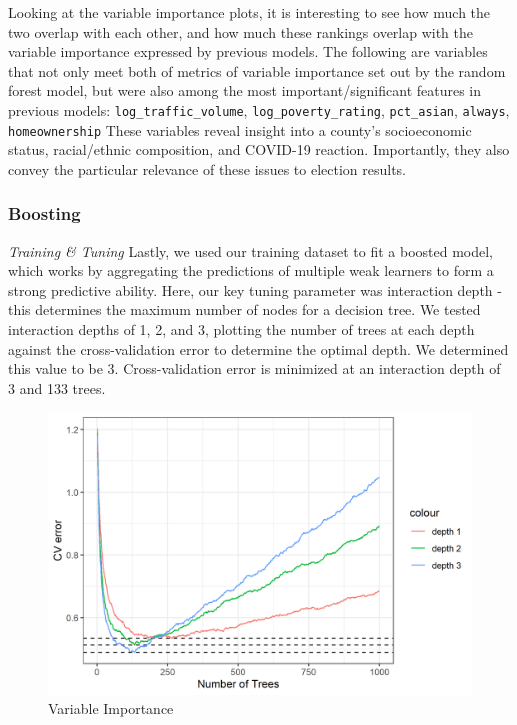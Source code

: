 \documentclass[
]{article}
\begin{document}
Looking at the variable importance plots, it is interesting to see how much the two overlap with each other, and how much these rankings overlap with the variable importance expressed by previous models. The following are variables that not only meet both of metrics of variable importance set out by the random forest model, but were also among the most
important/significant features in previous models:
\texttt{log\_traffic\_volume}, \texttt{log\_poverty\_rating}, \texttt{pct\_asian}, \texttt{always}, \texttt{homeownership}
These variables reveal insight into a county's socioeconomic status, racial/ethnic composition, and COVID-19 reaction. Importantly, they also convey the particular relevance of these issues to election results.

\hypertarget{boosting}{%
\subsubsection{Boosting}\label{boosting}}

\emph{Training \& Tuning}
Lastly, we used our training dataset to fit a boosted model, which works by aggregating the predictions of multiple weak learners to form a strong predictive ability. Here, our key tuning parameter was interaction depth - this determines the maximum number of nodes for a decision tree. We tested interaction depths of 1, 2, and 3, plotting the number of trees at each depth against the cross-validation error to determine the optimal depth. We determined this value to be 3. Cross-validation error is minimized at an interaction depth of 3 and 133 trees.

\begin{figure}

{\centering \includegraphics[width=0.8\linewidth]{../results/gbm_CV_errs} 

}

\caption{Variable Importance}\label{fig:gbm-CV-errs}
\end{figure}
\end{document}
